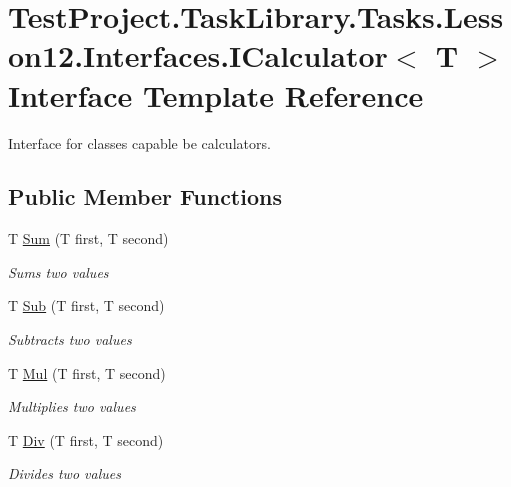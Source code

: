 \hypertarget{interface_test_project_1_1_task_library_1_1_tasks_1_1_lesson12_1_1_interfaces_1_1_i_calculator}{}\section{Test\+Project.\+Task\+Library.\+Tasks.\+Lesson12.\+Interfaces.\+I\+Calculator$<$ T $>$ Interface Template Reference}
\label{interface_test_project_1_1_task_library_1_1_tasks_1_1_lesson12_1_1_interfaces_1_1_i_calculator}


Interface for classes capable be calculators.  


\subsection*{Public Member Functions}
\begin{DoxyCompactItemize}
\item 
T \mbox{\hyperlink{interface_test_project_1_1_task_library_1_1_tasks_1_1_lesson12_1_1_interfaces_1_1_i_calculator_a23e6c8186d4df3c4272d1032d23fb911}{Sum}} (T first, T second)
\begin{DoxyCompactList}\small\item\em Sums two values \end{DoxyCompactList}\item 
T \mbox{\hyperlink{interface_test_project_1_1_task_library_1_1_tasks_1_1_lesson12_1_1_interfaces_1_1_i_calculator_a0d7d46a69199a8fe033367e58253c0ef}{Sub}} (T first, T second)
\begin{DoxyCompactList}\small\item\em Subtracts two values \end{DoxyCompactList}\item 
T \mbox{\hyperlink{interface_test_project_1_1_task_library_1_1_tasks_1_1_lesson12_1_1_interfaces_1_1_i_calculator_a4cfce569e1e681986409a9e2003c3fcc}{Mul}} (T first, T second)
\begin{DoxyCompactList}\small\item\em Multiplies two values \end{DoxyCompactList}\item 
T \mbox{\hyperlink{interface_test_project_1_1_task_library_1_1_tasks_1_1_lesson12_1_1_interfaces_1_1_i_calculator_a07b7931b3c0bd53ad24e46f511a5d3ce}{Div}} (T first, T second)
\begin{DoxyCompactList}\small\item\em Divides two values \end{DoxyCompactList}\end{DoxyCompactItemize}


